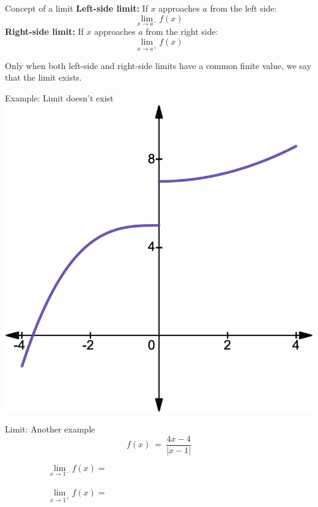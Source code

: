 \documentclass{./../../Latex/teaching_slides}
\begin{document}
\begin{frame}{Concept of a limit}
\textbf{Left-side limit:} If $x$ approaches $a$ from the left side:
$$\lim_{x \rightarrow a^-} f(x) $$
 \textbf{Right-side limit:} If $x$ approaches $a$ from the right side:
$$\lim_{x \rightarrow a^+} f(x) $$

Only when both left-side and right-side limits have a common finite value, we say that the limit exists. 
 
\end{frame}

\begin{frame}{Example: Limit doesn't exist}
\vspace{1em}
\centering
\includegraphics[scale=0.225]{lim1.png}
\end{frame}

\begin{frame}{Limit: Another example}
$$f(x)\ =\ \frac{4x-4}{\left|x-1\right|} $$
\vspace{1em}

$$\lim_{x \rightarrow 1^-} f(x) = \hspace{8cm} $$ \\

$$\lim_{x \rightarrow 1^+} f(x) = \hspace{8cm} $$

\end{frame}
\end{document}
